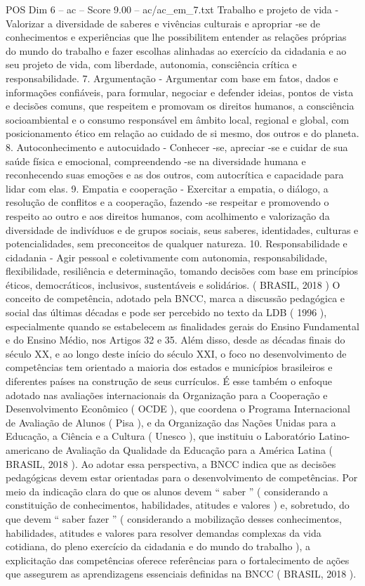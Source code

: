 \begin{textsample}{POS Dim 6 – ac – Score 9.00 – ac/ac\_em\_7.txt}
Trabalho e projeto de vida - Valorizar a diversidade de saberes e vivências culturais e apropriar -se de conhecimentos e experiências que lhe possibilitem entender as relações próprias do mundo do trabalho e fazer escolhas alinhadas ao exercício da cidadania e ao seu projeto de vida, com liberdade, autonomia, consciência crítica e responsabilidade. 7.
Argumentação - Argumentar com base em fatos, dados e informações confiáveis, para formular, negociar e defender ideias, pontos de vista e decisões comuns, que respeitem e promovam os direitos humanos, a consciência socioambiental e o consumo responsável em âmbito local, regional e global, com posicionamento ético em relação ao cuidado de si mesmo, dos outros e do planeta. 8.
Autoconhecimento e autocuidado - Conhecer -se, apreciar -se e cuidar de sua saúde física e emocional, compreendendo -se na diversidade humana e reconhecendo suas emoções e as dos outros, com autocrítica e capacidade para lidar com elas. 9.
Empatia e cooperação - Exercitar a empatia, o diálogo, a resolução de conflitos e a cooperação, fazendo -se respeitar e promovendo o respeito ao outro e aos direitos humanos, com acolhimento e valorização da diversidade de indivíduos e de grupos sociais, seus saberes, identidades, culturas e potencialidades, sem preconceitos de qualquer natureza. 10.
Responsabilidade e cidadania - Agir pessoal e coletivamente com autonomia, responsabilidade, flexibilidade, resiliência e determinação, tomando decisões com base em princípios éticos, democráticos, inclusivos, sustentáveis e solidários. ( BRASIL, 2018 ) O conceito de competência, adotado pela BNCC, marca a discussão pedagógica e social das últimas décadas e pode ser percebido no texto da LDB ( 1996 ), especialmente quando se estabelecem as finalidades gerais do Ensino Fundamental e do Ensino Médio, nos Artigos 32 e 35.
Além disso, desde as décadas finais do século XX, e ao longo deste início do século XXI, o foco no desenvolvimento de competências tem orientado a maioria dos estados e municípios brasileiros e diferentes países na construção de seus currículos.
É esse também o enfoque adotado nas avaliações internacionais da Organização para a Cooperação e Desenvolvimento Econômico ( OCDE ), que coordena o Programa Internacional de Avaliação de Alunos ( Pisa ), e da Organização das Nações Unidas para a Educação, a Ciência e a Cultura ( Unesco ), que instituiu o Laboratório Latino-americano de Avaliação da Qualidade da Educação para a América Latina ( BRASIL, 2018 ).
Ao adotar essa perspectiva, a BNCC indica que as decisões pedagógicas devem estar orientadas para o desenvolvimento de competências.
Por meio da indicação clara do que os alunos devem “ saber ” ( considerando a constituição de conhecimentos, habilidades, atitudes e valores ) e, sobretudo, do que devem “ saber fazer ” ( considerando a mobilização desses conhecimentos, habilidades, atitudes e valores para resolver demandas complexas da vida cotidiana, do pleno exercício da cidadania e do mundo do trabalho ), a explicitação das competências oferece referências para o fortalecimento de ações que assegurem as aprendizagens essenciais definidas na BNCC ( BRASIL, 2018 ).

\end{textsample}
